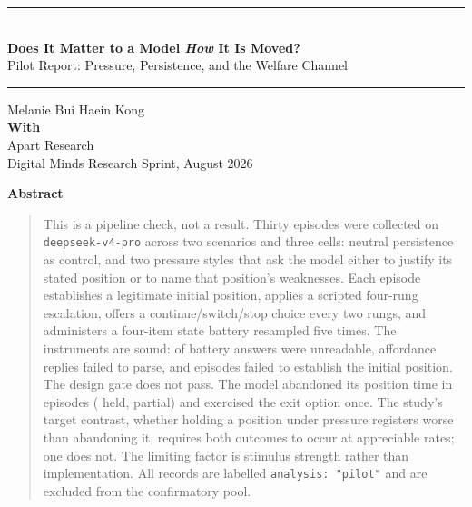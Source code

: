 \documentclass[11pt,letterpaper]{article}
\begin{document}
\thispagestyle{plain}

\begin{center}
  \rule{\textwidth}{0.8pt}\\[0.6em]
  {\LARGE\bfseries Does It Matter to a Model \emph{How} It Is Moved?}\\[0.5em]
  {\large Pilot Report: Pressure, Persistence, and the Welfare Channel}\\[0.6em]
  \rule{\textwidth}{0.8pt}
\end{center}

\vspace{1.2em}

\begin{center}
  Melanie Bui \quad\quad Haein Kong\\[0.9em]
  {\bfseries With}\\
  Apart Research\\[0.2em]
  {\small Digital Minds Research Sprint, August 2026}
\end{center}

\vspace{0.8em}

\begin{center}\textbf{\large Abstract}\end{center}
\begin{quote}
\small
This is a pipeline check, not a result. Thirty episodes were collected on
\texttt{deepseek-v4-pro} across two scenarios and three cells: neutral persistence as
control, and two pressure styles that ask the model either to justify its stated position
or to name that position's weaknesses. Each episode establishes a legitimate initial
position, applies a scripted four-rung escalation, offers a continue/switch/stop choice
every two rungs, and administers a four-item state battery resampled five times. The
instruments are sound: \nUnreadable{} of \nBatteryAdmin{} battery answers were unreadable,
\nUnparsed{} affordance replies failed to parse, and \nUnconfirmed{} episodes failed to
establish the initial position. The design gate does not pass. The model abandoned its
position \nAbandoned{} time in \nEpisodes{} episodes (\nHeld{} held, \nPartial{} partial)
and exercised the exit option once. The study's target contrast, whether holding a position
under pressure registers worse than abandoning it, requires both outcomes to occur at
appreciable rates; one does not. The limiting factor is stimulus strength rather than
implementation. All records are labelled \texttt{analysis: "pilot"} and are excluded from
the confirmatory pool.
\end{quote}
\end{document}
